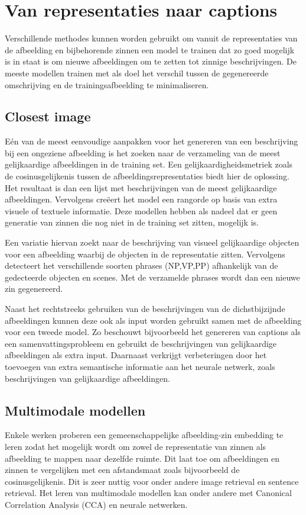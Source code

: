 \section{Van representaties naar captions}
Verschillende methodes kunnen worden gebruikt om vanuit de representaties van de afbeelding en bijbehorende zinnen een model te trainen dat zo goed mogelijk is in staat is om nieuwe afbeeldingen om te zetten tot zinnige beschrijvingen. De meeste modellen trainen met als doel het verschil tussen de gegenereerde omschrijving en de trainingsafbeelding te minimaliseren.

\subsection{Closest image}
E\'en van de meest eenvoudige aanpakken voor het genereren van een beschrijving bij een ongeziene afbeelding is het zoeken naar de verzameling van de meest gelijkaardige afbeeldingen in de training set. Een gelijkaardigheidsmetriek zoals de cosinusgelijkenis tussen de afbeeldingsrepresentaties biedt hier de oplossing. Het resultaat is dan een lijst met beschrijvingen van de meest gelijkaardige afbeeldingen. Vervolgens cre\"eert het model een rangorde op basis van extra visuele of textuele informatie.\cite{Ordonez2011}\cite{Oliva2006}\cite{Torralba}\cite{Devlin}
Deze modellen hebben als nadeel dat er geen generatie van zinnen die nog niet in de training set zitten, mogelijk is.

Een variatie hiervan \cite{Kuznetsova}\cite{Gupta} zoekt naar de beschrijving van visueel gelijkaardige objecten voor een afbeelding waarbij de objecten in de representatie zitten. Vervolgens detecteert het verschillende soorten phrases (NP,VP,PP) afhankelijk van de gedecteerde objecten en scenes. Met de verzamelde phrases wordt dan een nieuwe zin gegenereerd.

Naast het rechtstreeks gebruiken van de beschrijvingen van de dichstbijzijnde afbeeldingen kunnen deze ook als input worden gebruikt samen met de afbeelding voor een tweede model. \cite{Mason} Zo beschouwt \cite{Mason} bijvoorbeeld het genereren van captions als een samenvattingsprobleem en gebruikt de beschrijvingen van gelijkaardige afbeeldingen als extra input. Daarnaast verkrijgt \cite{Xu} verbeteringen door het toevoegen van extra semantische informatie aan het neurale netwerk, zoals beschrijvingen van gelijkaardige afbeeldingen.
 
\subsection{Multimodale modellen}
Enkele werken proberen een gemeenschappelijke afbeelding-zin embedding te leren zodat het mogelijk wordt om zowel de representatie van zinnen als afbeelding te mappen naar dezelfde ruimte. Dit laat toe om afbeeldingen en zinnen te vergelijken met een afstandsmaat zoals bijvoorbeeld de cosinusgelijkenis. Dit is zeer nuttig voor onder andere image retrieval en sentence retrieval. Het leren van multimodale modellen kan onder andere met Canonical Correlation Analysis (CCA)\cite{Hodosh2013} en neurale netwerken. \cite{Mao2014}\cite{Karpathy2014}\cite{Fang}

